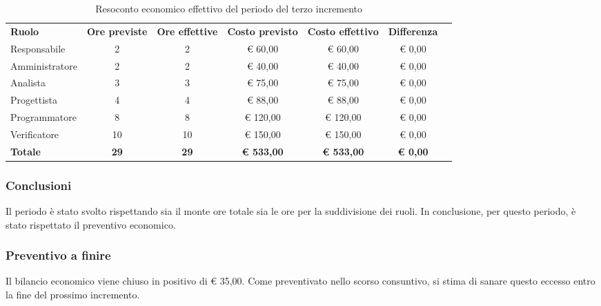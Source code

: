 \documentclass[../piano-di-progetto.tex]{subfiles}
\begin{document}
  \begin{table}[H]
    \centering
    \begin{tabular}{lcccccc}
      \rowcolor{lightgray}
      \textbf{Ruolo}  & \textbf{Ore previste} & \textbf{Ore effettive} & \textbf{Costo previsto} & \textbf{Costo effettivo} & \textbf{Differenza} \\
Responsabile    & 2           & 2           & € 60,00           & € 60,00           & € 0,00          \\
Amministratore  & 2           & 2           & € 40,00           & € 40,00           & € 0,00          \\
Analista        & 3           & 3           & € 75,00           & € 75,00           & € 0,00          \\
Progettista     & 4           & 4           & € 88,00           & € 88,00           & € 0,00          \\
Programmatore   & 8           & 8           & € 120,00          & € 120,00          & € 0,00          \\
Verificatore    & 10          & 10          & € 150,00          & € 150,00          & € 0,00          \\
\textbf{Totale} & \textbf{29} & \textbf{29} & \textbf{€ 533,00} & \textbf{€ 533,00} & \textbf{€ 0,00}

    \end{tabular}
    \caption{Resoconto economico effettivo del periodo del terzo incremento}
  \end{table}


\subsubsection{Conclusioni}
Il periodo è stato svolto rispettando sia il monte ore totale sia le ore per la suddivisione dei ruoli. In conclusione, per questo periodo, è stato rispettato il preventivo economico.

\subsubsection{Preventivo a finire}
Il bilancio economico viene chiuso in positivo di € 35,00. Come preventivato nello scorso consuntivo, si stima di sanare questo eccesso entro la fine del prossimo incremento.
\end{document}
